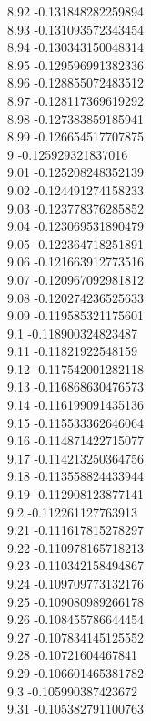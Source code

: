 {8.92	-0.131848282259894\\
8.93	-0.131093572343454\\
8.94	-0.130343150048314\\
8.95	-0.129596991382336\\
8.96	-0.128855072483512\\
8.97	-0.128117369619292\\
8.98	-0.127383859185941\\
8.99	-0.126654517707875\\
9	-0.125929321837016\\
9.01	-0.125208248352139\\
9.02	-0.124491274158233\\
9.03	-0.123778376285852\\
9.04	-0.123069531890479\\
9.05	-0.122364718251891\\
9.06	-0.121663912773516\\
9.07	-0.120967092981812\\
9.08	-0.120274236525633\\
9.09	-0.119585321175601\\
9.1	-0.118900324823487\\
9.11	-0.11821922548159\\
9.12	-0.117542001282118\\
9.13	-0.116868630476573\\
9.14	-0.116199091435136\\
9.15	-0.115533362646064\\
9.16	-0.114871422715077\\
9.17	-0.114213250364756\\
9.18	-0.113558824433944\\
9.19	-0.112908123877141\\
9.2	-0.112261127763913\\
9.21	-0.111617815278297\\
9.22	-0.110978165718213\\
9.23	-0.110342158494867\\
9.24	-0.109709773132176\\
9.25	-0.109080989266178\\
9.26	-0.108455786644454\\
9.27	-0.107834145125552\\
9.28	-0.10721604467841\\
9.29	-0.106601465381782\\
9.3	-0.105990387423672\\
9.31	-0.105382791100763\\
}
